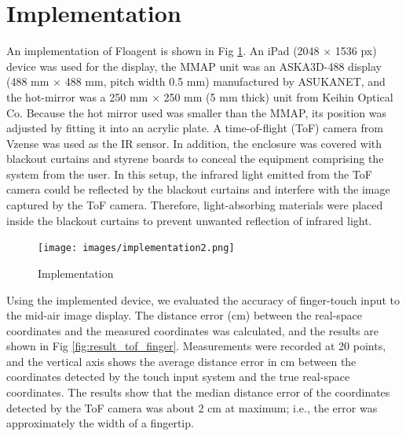 \documentclass[sigconf]{acmart}
\begin{document}
\section{Implementation \label{hard}}

An implementation of Floagent is shown in Fig \ref{fig:opt-sys2}.
An iPad (2048 $\times$ 1536 px) device was used for the display, the MMAP unit was an ASKA3D-488 display (488 mm $\times$ 488 mm, pitch width 0.5 mm) manufactured by ASUKANET, and the hot-mirror was a 250 mm $\times$ 250 mm (5 mm thick) unit from Keihin Optical Co.
Because the hot mirror used was smaller than the MMAP, its position was adjusted by fitting it into an acrylic plate.
A time-of-flight (ToF) camera from Vzense was used as the IR sensor.
In addition, the enclosure was covered with blackout curtains and styrene boards to conceal the equipment comprising the system from the user.
In this setup, the infrared light emitted from the ToF camera could be reflected by the blackout curtains and interfere with the image captured by the ToF camera.
Therefore, light-absorbing materials were placed inside the blackout curtains to prevent unwanted reflection of infrared light.

\begin{figure}[tb]
  \begin{center}
    \texttt{[image: images/implementation2.png]}
    \vspace{-0.9\baselineskip}
    \caption{Implementation}
    \vspace{-1\baselineskip}
    \label{fig:opt-sys2}
  \end{center}
\end{figure}

Using the implemented device, we evaluated the accuracy of finger-touch input to the mid-air image display.
The distance error (cm) between the real-space coordinates and the measured coordinates was calculated, and the results are shown in Fig \ref{fig:result_tof_finger}.
Measurements were recorded at 20 points, and the vertical axis shows the average distance error in cm between the coordinates detected by the touch input system and the true real-space coordinates.
The results show that the median distance error of the coordinates detected by the ToF camera was about 2 cm at maximum; i.e., the error was approximately the width of a fingertip.
\end{document}
